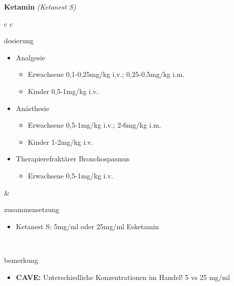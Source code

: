 \begin{frame}{
    \textbf{Ketamin}
    \textit{(Ketanest S)}
}
    \begin{tabular}{c c}
        \begin{beamercolorbox}[wd=\boxwidth\textwidth,ht=\boxheight\textheight,sep=1em]{dosierung}
            \tiny
            \begin{itemize}
                \item { 
                    Analgesie 
                    \begin{itemize}
                        \tiny
                        \item Erwachsene 0,1-0,25mg/kg i.v.; 0,25-0,5mg/kg i.m.
                        \item Kinder 0,5-1mg/kg i.v.
                    \end{itemize}
                }
                \item {
                    Anästhesie
                    \begin{itemize}
                        \tiny
                        \item Erwachsene 0,5-1mg/kg i.v.; 2-6mg/kg i.m.
                        \item Kinder 1-2mg/kg i.v.
                    \end{itemize}
                }
                \item {
                    Therapierefraktärer Bronchospasmus
                    \begin{itemize}
                        \tiny
                        \item Erwachsene 0,5-1mg/kg i.v.
                    \end{itemize}
                }
            \end{itemize}
        \end{beamercolorbox} & 
        \begin{beamercolorbox}[wd=\boxwidth\textwidth,ht=\boxheight\textheight,sep=1em]{zusammensetzung}
            \begin{itemize}
                \item Ketanest S: 5mg/ml oder 25mg/ml Esketamin	
            \end{itemize}
        \end{beamercolorbox} \\
        \begin{beamercolorbox}[wd=\textwidth,ht=\boxheight\textheight,sep=1em]{bemerkung}
            \begin{itemize}
                \item \textbf{CAVE:} Unterschiedliche Konzentrationen im Handel! 5 vs 25 mg/ml
            \end{itemize}
        \end{beamercolorbox} \\
    \end{tabular}
\end{frame}

